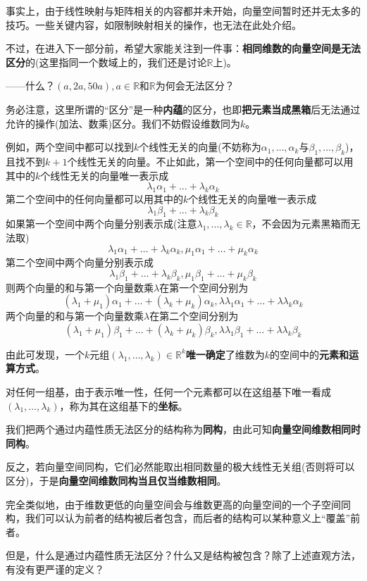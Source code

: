\documentclass[a4paper,UTF8,fontset=windows]{ctexart}
\newcommand*{\note}{\noindent *}
\begin{document}
事实上，由于线性映射与矩阵相关的内容都并未开始，向量空间暂时还并无太多的技巧。一些关键内容，如限制映射相关的操作，也无法在此处介绍。

不过，在进入下一部分前，希望大家能关注到一件事：\textbf{相同维数的向量空间是无法区分}的(这里指同一个数域上的，我们还是讨论$\mathbb{R}$上)。

——什么？$(a,2a,50a),a\in\mathbb{R}$和$\mathbb{R}$为何会无法区分？

务必注意，这里所谓的``区分''是一种\textbf{内蕴}的区分，也即\textbf{把元素当成黑箱}后无法通过允许的操作(加法、数乘)区分。我们不妨假设维数同为$k$。

例如，两个空间中都可以找到$k$个线性无关的向量(不妨称为$\alpha_1,\dots,\alpha_k$与$\beta_1,\dots,\beta_k$)，且找不到$k+1$个线性无关的向量。不止如此，第一个空间中的任何向量都可以用其中的$k$个线性无关的向量唯一表示成
$$\lambda_1\alpha_1+\dots+\lambda_k\alpha_k$$
第二个空间中的任何向量都可以用其中的$k$个线性无关的向量唯一表示成
$$\lambda_1\beta_1+\dots+\lambda_k\beta_k$$
如果第一个空间中两个向量分别表示成(注意$\lambda_1,\dots,\lambda_k\in\mathbb{R}$，不会因为元素黑箱而无法取)
$$\lambda_1\alpha_1+\dots+\lambda_k\alpha_k,\mu_1\alpha_1+\dots+\mu_k\alpha_k$$
第二个空间中两个向量分别表示成
$$\lambda_1\beta_1+\dots+\lambda_k\beta_k,\mu_1\beta_1+\dots+\mu_k\beta_k$$
则两个向量的和与第一个向量数乘$\lambda$在第一个空间分别为
$$(\lambda_1+\mu_1)\alpha_1+\dots+(\lambda_k+\mu_k)\alpha_k,\lambda\lambda_1\alpha_1+\dots+\lambda\lambda_k\alpha_k$$
两个向量的和与第一个向量数乘$\lambda$在第二个空间分别为
$$(\lambda_1+\mu_1)\beta_1+\dots+(\lambda_k+\mu_k)\beta_k,\lambda\lambda_1\beta_1+\dots+\lambda\lambda_k\beta_k$$

由此可发现，一个$k$元组$(\lambda_1,\dots,\lambda_k)\in\mathbb{R}^k$\textbf{唯一确定}了维数为$k$的空间中的\textbf{元素和运算方式}。

对任何一组基，由于表示唯一性，任何一个元素都可以在这组基下唯一看成$(\lambda_1,\dots,\lambda_k)$，称为其在这组基下的\textbf{坐标}。

我们把两个通过内蕴性质无法区分的结构称为\textbf{同构}，由此可知\textbf{向量空间维数相同时同构}。

反之，若向量空间同构，它们必然能取出相同数量的极大线性无关组(否则将可以区分)，于是\textbf{向量空间维数同构当且仅当维数相同}。

完全类似地，由于维数更低的向量空间会与维数更高的向量空间的一个子空间同构，我们可以认为前者的结构被后者包含，而后者的结构可以某种意义上``覆盖''前者。

\note 但是，什么是通过内蕴性质无法区分？什么又是结构被包含？除了上述直观方法，有没有更严谨的定义？
\end{document}
